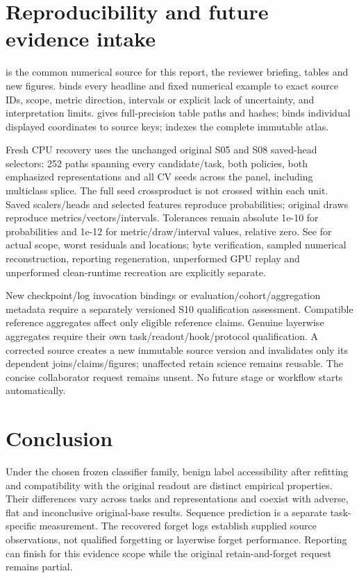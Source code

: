 \documentclass[11pt]{article}
\begin{document}
\section{Reproducibility and future evidence intake}
 is the common numerical source for this report, the reviewer briefing, tables and new figures.  binds every headline and fixed numerical example to exact source IDs, scope, metric direction, intervals or explicit lack of uncertainty, and interpretation limits.  gives full-precision table paths and hashes;  binds individual displayed coordinates to source keys;  indexes the complete immutable atlas.\par
Fresh CPU recovery uses the unchanged original S05 and S08 saved-head selectors: 252 paths spanning every candidate/task, both policies, both emphasized representations and all CV seeds across the panel, including multiclass splice. The full seed crossproduct is not crossed within each unit. Saved scalers/heads and selected features reproduce probabilities; original draws reproduce metrics/vectors/intervals. Tolerances remain absolute 1e-10 for probabilities and 1e-12 for metric/draw/interval values, relative zero. See  for actual scope, worst residuals and locations; byte verification, sampled numerical reconstruction, reporting regeneration, unperformed GPU replay and unperformed clean-runtime recreation are explicitly separate.\par
New checkpoint/log invocation bindings or evaluation/cohort/aggregation metadata require a separately versioned S10 qualification assessment. Compatible reference aggregates affect only eligible reference claims. Genuine layerwise aggregates require their own task/readout/hook/protocol qualification. A corrected source creates a new immutable source version and invalidates only its dependent joins/claims/figures; unaffected retain science remains reusable. The concise collaborator request remains unsent. No future stage or workflow starts automatically.\par
\section{Conclusion}
Under the chosen frozen classifier family, benign label accessibility after refitting and compatibility with the original readout are distinct empirical properties. Their differences vary across tasks and representations and coexist with adverse, flat and inconclusive original-base results. Sequence prediction is a separate task-specific measurement. The recovered forget logs establish supplied source observations, not qualified forgetting or layerwise forget performance. Reporting can finish for this evidence scope while the original retain-and-forget request remains partial.\par
\end{document}
